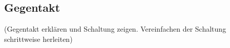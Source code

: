 \subsection{Gegentakt} \label{subsec:gegentakt}
(Gegentakt erklären und Schaltung zeigen. Vereinfachen der Schaltung schrittweise herleiten)
